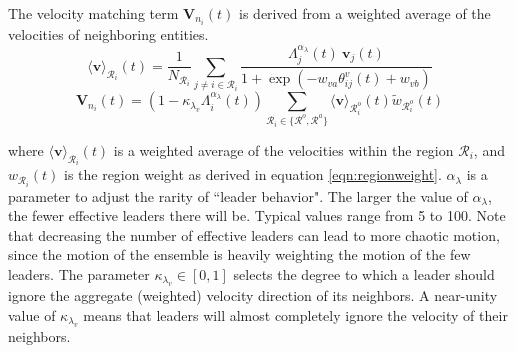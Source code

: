 \documentclass[conference]{IEEEtran}
\begin{document}
The velocity matching term $\mathbf{V}_{n_i}(t)$ is derived from a weighted average of the velocities of neighboring entities.
\begin{equation}
    \langle\mathbf{v}\rangle_{\mathcal{R}_i}(t) = \frac{1}{N_{\mathcal{R}_i}}\sum_{j\neq i\in\mathcal{R}_i}\frac{\Lambda_j^{\alpha_\lambda}(t)~\mathbf{v}_j(t)}{1+\exp\left(-w_{va}\theta^v_{ij}(t)+w_{vb}\right)}
    \label{eqn:individualVelocityWeighting}
\end{equation}
\begin{equation}
    \mathbf{V}_{n_i}(t) = \left(1 - \kappa_{\lambda_v}\Lambda_i^{\alpha_\lambda}(t)\right)\sum_{\mathcal{R}_i\in\{\mathcal{R}^o,\mathcal{R}^a\}}\langle\mathbf{v}\rangle_{\mathcal{R}^o_i}(t)\widetilde{w}_{\mathcal{R}^o_i}(t)
    \label{eqn:velocities}
\end{equation}

where $\langle\mathbf{v}\rangle_{\mathcal{R}_i}(t)$ is a weighted average of the velocities within the region $\mathcal{R}_i$, and $w_{\mathcal{R}_i}(t)$ is the region weight as derived in equation \ref{eqn:regionweight}.
$\alpha_\lambda$ is a parameter to adjust the rarity of ``leader behavior".
The larger the value of $\alpha_\lambda$, the fewer effective leaders there will be.
Typical values range from 5 to 100.
Note that decreasing the number of effective leaders can lead to more chaotic motion, since the motion of the ensemble is heavily weighting the motion of the few leaders.
The parameter $\kappa_{\lambda_v}\in[0,1]$ selects the degree to which a leader should ignore the aggregate (weighted) velocity direction of its neighbors.
A near-unity value of $\kappa_{\lambda_v}$ means that leaders will almost completely ignore the velocity of their neighbors.
\end{document}
